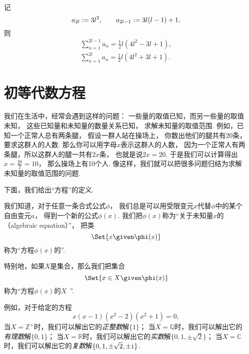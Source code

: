 \begin{proposition}[朱世杰公式]
记\begin{equation*}
	a_{2l}
	:=
	3 l^2,
	\qquad
	a_{2l-1}
	:=
	3l(l-1) + 1,
\end{equation*}
则\begin{gather*}
	\sum_{n=1}^{2l-1} a_n
	= \frac12 l (4l^2-3l+1), \\
	\sum_{n=1}^{2l} a_n
	= \frac12 l (4l^2+3l+1).
\end{gather*}
\end{proposition}

\section{初等代数方程}
我们在生活中，经常会遇到这样的问题：
一些量的取值已知，而另一些量的取值未知，
这些已知量和未知量的数量关系已知，
求解未知量的取值范围.
例如，已知一个正常人总有两条腿，
假设一群人站在操场上，
你数出他们的腿共有20条，
要求这群人的人数.
那么你可以用字母\(x\)表示这群人的人数，
因为一个正常人有两条腿，所以这群人的腿一共有\(2x\)条，
也就是说\(2x=20\).
于是我们可以计算得出\(x=\frac{20}{2}=10\)，
那么操场上有10个人.
像这样，我们就可以把很多问题归结为求解未知量的取值范围的问题.

下面，我们给出“方程”的定义.

我们知道，对于任意一条合式公式\(\phi\)，
我们总是可以用受限变元\(x\)代替\(\phi\)中的某个自由变元\(a\)，
得到一个新的公式\(\phi(x)\).
我们把\(\phi(x)\)称为“关于未知量\(x\)的（algebraic equation）”，
把类\begin{equation*}
	\Set{ x \given \phi(x) }
\end{equation*}
称为“方程\(\phi(x)\)的”.

特别地，如果\(X\)是集合，那么我们把集合\begin{equation*}
	\Set{ x \in X \given \phi(x) }
\end{equation*}
称为“方程\(\phi(x)\)的\(X\)~”.

例如，对于给定的方程\begin{equation*}
	x(x-1)(x^2-2)(x^2+1)=0,
\end{equation*}
当\(X=\mathbb{Z}^+\)时，我们可以解出它的\emph{正整数}解\(\{1\}\)；
当\(X=\mathbb{Q}\)时，我们可以解出它的\emph{有理数}解\(\{0,1\}\)；
当\(X=\mathbb{R}\)时，我们可以解出它的\emph{实数}解\(\{0,1,\pm\sqrt2\}\)；
当\(X=\mathbb{C}\)时，我们可以解出它的\emph{复数}解\(\{0,1,\pm\sqrt2,\pm\kern1pt\mathrm{i}\kern1pt\}\).

